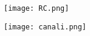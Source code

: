 \documentclass[a4paper]{article}
\begin{document}
	
	\maketitle
	\begin{figure}
		\texttt{[image: RC.png]}

	\end{figure}

	\begin{figure}
		\texttt{[image: canali.png]}

	\end{figure}
\end{document}
